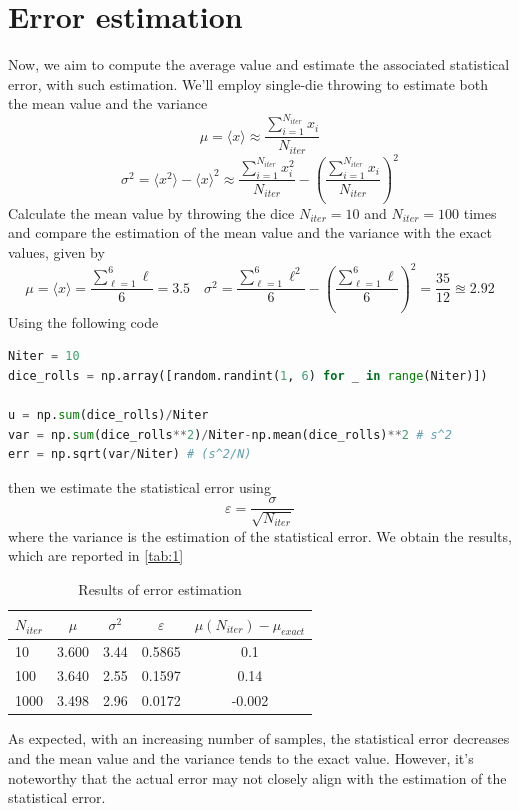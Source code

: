 \documentclass{article}
\begin{document}
\section{Error estimation}
Now, we aim to compute the average value and estimate the associated statistical error, with such estimation. We'll employ single-die throwing to estimate both the mean value and the variance
\begin{equation}
    \mu=\langle x\rangle\approx\frac{\sum_{i=1}^{N_{iter}}{x_i}}{N_{iter}}
\end{equation}
\begin{equation}
    \sigma^2=\langle x^2\rangle-\langle x \rangle^2\approx\frac{\sum_{i=1}^{N_{iter}}{x_i^2}}{N_{iter}}-\left(\frac{\sum_{i=1}^{N_{iter}}{x_i}}{N_{iter}}\right)^2
\end{equation}
Calculate the mean value by throwing the dice $N_{iter}=10$ and $N_{iter}=100$ times and compare the estimation of the mean value and the variance with the exact values, given by
\begin{equation*}
    \mu=\langle x\rangle=\frac{\sum_{\ell=1}^{6}{\ell}}{6}=3.5\quad \sigma^2=\frac{\sum_{\ell=1}^{6}{\ell^2}}{6}-\left(\frac{\sum_{\ell=1}^{6}{\ell}}{6}\right)^2=\frac{35}{12}\approxeq2.92
\end{equation*}
Using the following code
\begin{lstlisting}[language=Python]
Niter = 10
dice_rolls = np.array([random.randint(1, 6) for _ in range(Niter)])

u = np.sum(dice_rolls)/Niter
var = np.sum(dice_rolls**2)/Niter-np.mean(dice_rolls)**2 # s^2
err = np.sqrt(var/Niter) # (s^2/N)
\end{lstlisting}
then we estimate the statistical error using
\begin{equation}
    \varepsilon=\frac\sigma{\sqrt{N_{iter}}}
\end{equation}
where the variance is the estimation of the statistical error. We obtain the results, which are reported in \autoref{tab:1}
\begin{table}[H]
    \centering
    \begin{tabular}{|l|c|c|c|c|}
        \hline $N_{iter}$  & $\mu$ & $\sigma^2$ &  $\varepsilon $ & $\mu(N_{iter})-\mu_{exact}$\\\hline\hline
        10 & 3.600 & 3.44 & 0.5865 & 0.1\\\hline
        100 & 3.640 & 2.55 & 0.1597 & 0.14\\\hline
        1000 & 3.498 & 2.96 & 0.0172 & -0.002\\\hline
    \end{tabular}
    \caption{Results of error estimation}
    \label{tab:1}
\end{table}
\noindent As expected, with an increasing number of samples, the statistical error decreases and the mean value and the variance tends to the exact value. However, it's noteworthy that the actual error may not closely align with the estimation of the statistical error.
\end{document}
